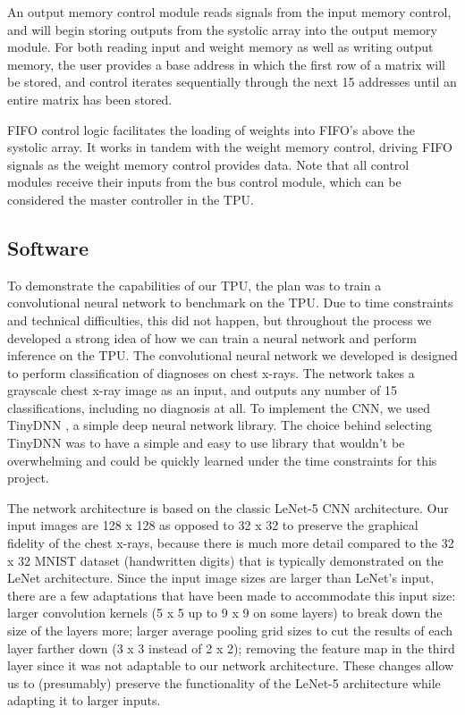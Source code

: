 \documentclass[11pt, conference, onecolumn]{IEEEtran}
\begin{document}
        An output memory control module reads signals from the input memory control, and
        will begin storing outputs from the systolic array into the output memory module.
        For both reading input and weight memory as well as writing output memory, the
        user provides a base address in which the first row of a matrix will be stored,
        and control iterates sequentially through the next 15 addresses until an entire
        matrix has been stored.

        FIFO control logic facilitates the loading of weights into FIFO's above the
        systolic array. It works in tandem with the weight memory control, driving FIFO
        signals as the weight memory control provides data. Note that all control
        modules receive their inputs from the bus control module, which can be considered
        the master controller in the TPU.

    \subsection{Software}
    To demonstrate the capabilities of our TPU, the plan was to train a convolutional
    neural network to benchmark on the TPU. Due to time constraints and technical
    difficulties, this did not happen, but throughout the process we developed a strong
    idea of how we can train a neural network and perform inference on the TPU. The
    convolutional neural network we developed is designed to perform classification of
    diagnoses on chest x-rays. The network takes a grayscale chest x-ray image as an
    input, and outputs any number of 15 classifications, including no diagnosis at all. To
    implement the CNN, we used TinyDNN \cite{b7}, a simple deep neural network library. The
    choice behind selecting TinyDNN was to have a simple and easy to use library that
    wouldn’t be overwhelming and could be quickly learned under the time constraints for
    this project.

    The network architecture is based on the classic LeNet-5 CNN architecture. Our
    input images are 128 x 128 as opposed to 32 x 32 to preserve the graphical fidelity of
    the chest x-rays, because there is much more detail compared to the 32 x 32 MNIST
    dataset (handwritten digits) that is typically demonstrated on the LeNet architecture.
    Since the input image sizes are larger than LeNet’s input, there are a few adaptations
    that have been made to accommodate this input size: larger convolution kernels
    (5 x 5 up to 9 x 9 on some layers) to break down the size of the layers more; larger
    average pooling grid sizes to cut the results of each layer farther down
    (3 x 3 instead of 2 x 2); removing the feature map in the third layer since it was not
    adaptable to our network architecture. These changes allow us to (presumably) preserve
    the functionality of the LeNet-5 architecture while adapting it to larger inputs.
\end{document}
